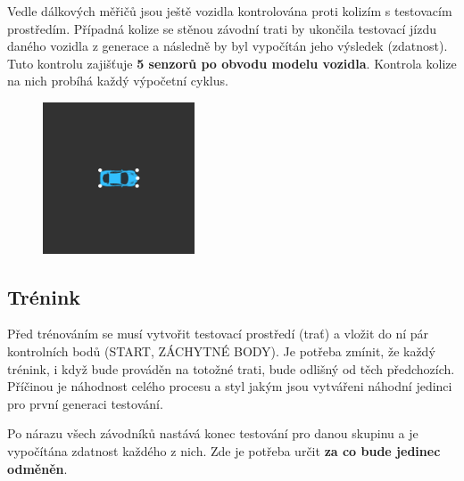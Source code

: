 \documentclass[a4paper,12pt]{article}
\newcommand{\tab}
{
    \hspace*{1em}
}
\begin{document}
            Vedle dálkových měřičů jsou ještě vozidla kontrolována proti kolizím s testovacím 
            prostředím. Případná kolize se stěnou závodní trati by ukončila testovací jízdu
            daného vozidla z generace a následně by byl vypočítán jeho výsledek (zdatnost).
            Tuto kontrolu zajišťuje \textbf{5 senzorů po obvodu modelu vozidla}. Kontrola
            kolize na nich probíhá každý výpočetní cyklus.
            \begin{figure}[H]
                \centering
                \includegraphics[trim = 7cm 7cm 7cm 7cm, clip, width=0.4\textwidth]{data/collisionpoints.png}
                \label{fig:collisionpoints}
            \end{figure}

        \vspace*{-3em}
        \subsection{Trénink}
            Před trénováním se musí vytvořit testovací prostředí (trať) a vložit
            do ní pár kontrolních bodů (START, ZÁCHYTNÉ BODY). Je potřeba zmínit,
            že každý trénink, i když bude prováděn na totožné trati, bude odlišný od těch
            předchozích. Příčinou je náhodnost celého procesu a styl jakým jsou vytvářeni
            náhodní jedinci pro první generaci testování.

            \tab Po nárazu všech závodníků nastává konec testování pro danou skupinu a 
            je vypočítána zdatnost každého z nich. Zde je potřeba určit \textbf{za co bude jedinec
            odměněn}. 
            
\end{document}
